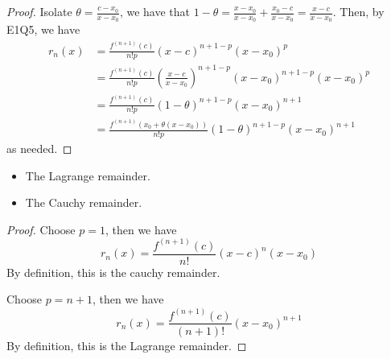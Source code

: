 \documentclass{homework}
\newcommand{\?}{\stackrel{?}{=}}
\theoremstyle{definition}
\begin{document}
\begin{proof}
    Isolate $\theta=\frac{c-x_0}{x-x_0}$, we have that $1-\theta=\frac{x-x_0}{x-x_0}+\frac{x_0-c}{x-x_0}=\frac{x-c}{x-x_0}$. Then, by E1Q5, we have \begin{align*}
        r_n(x)&=\frac{f^{(n+1)}(c)}{n!p}(x-c)^{n+1-p}(x-x_0)^p\\
        &=\frac{f^{(n+1)}(c)}{n!p}\left( \frac{x-c}{x-x_0} \right)^{n+1-p}(x-x_0)^{n+1-p}(x-x_0)^p\\
        &=\frac{f^{(n+1)}(c)}{n!p}(1-\theta)^{n+1-p}(x-x_0)^{n+1}\\
        &=\frac{f^{(n+1)}(x_0+\theta(x-x_0))}{n!p}(1-\theta)^{n+1-p}(x-x_0)^{n+1}
    \end{align*}
    as needed.
\end{proof}


\begin{itemize}
    \item The Lagrange remainder.
    \item The Cauchy remainder.
\end{itemize}

\begin{proof}
    Choose $p=1$, then we have \[r_n(x)=\frac{f^{(n+1)}(c)}{n!}(x-c)^n(x-x_0)\] By definition, this is the cauchy remainder.

    Choose $p=n+1$, then we have \[r_n(x)=\frac{f^{(n+1)}(c)}{(n+1)!}(x-x_0)^{n+1}\] By definition, this is the Lagrange remainder.
\end{proof}
\end{document}
